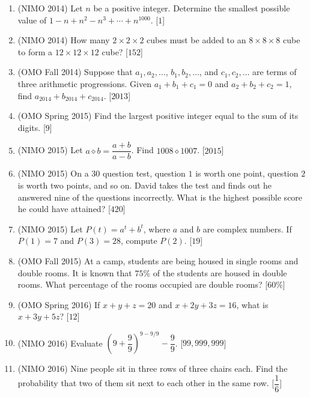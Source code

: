 \documentclass[11pt,paper=letter]{scrartcl}
\begin{document}
\begin{enumerate}
\item (NIMO 2014) Let $n$ be a positive integer. Determine the smallest possible value of $1 - n + n^2 - n^3 + \cdots + n^{1000}$. \hfill [$1$]

\item (NIMO 2014) How many $2 \times 2 \times 2$ cubes must be added to an $8 \times 8 \times 8$ cube to form a $12 \times 12 \times 12$ cube? \hfill [$152$]

\item (OMO Fall 2014) Suppose that $a_1, a_2, \ldots$, $b_1, b_2, \ldots$, and $c_1, c_2, \ldots$ are terms of three arithmetic progressions. Given $a_1 + b_1 + c_1 = 0$ and $a_2 + b_2 + c_2 = 1$, find $a_{2014} + b_{2014} + c_{2014}$. \hfill [$2013$]

\item (OMO Spring 2015) Find the largest positive integer equal to the sum of its digits. \hfill [$9$]

\item (NIMO 2015) Let $a \diamond b = \dfrac{a+b}{a-b}$. Find $1008 \diamond 1007$. \hfill [$2015$]

\item (NIMO 2015) On a $30$ question test, question $1$ is worth one point, question $2$ is worth two points, and so on. David takes the test and finds out he answered nine of the questions incorrectly. What is the highest possible score he could have attained? \hfill [$420$]

\item (NIMO 2015) Let $P(t) = a^t + b^t$, where $a$ and $b$ are complex numbers. If $P(1) = 7$ and $P(3) = 28$, compute $P(2)$. \hfill [$19$]

\item (OMO Fall 2015) At a camp, students are being housed in single rooms and double rooms. It is known that $75\%$ of the students are housed in double rooms. What percentage of the rooms occupied are double rooms? \hfill [$60\%$]

\item (OMO Spring 2016) If $x + y + z = 20$ and $x + 2y + 3z = 16$, what is $x + 3y + 5z$? \hfill [$12$]

\item (NIMO 2016) Evaluate $\left(9 + \dfrac{9}{9}\right)^{9 - 9/9} - \dfrac{9}{9}$. \hfill [$99,999,999$]

\item (NIMO 2016) Nine people sit in three rows of three chairs each. Find the probability that two of them sit next to each other in the same row. \hfill [$\dfrac{1}{6}$]

\end{enumerate}
\end{document}
